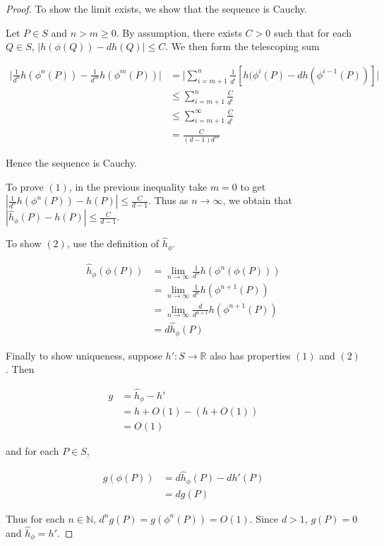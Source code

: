 \documentclass[12pt]{amsart}
\theoremstyle{definition}
\theoremstyle{remark}
\theoremstyle{definition}
\newcommand{\R}{\mathbb{R}}
\newcommand{\N}{\mathbb{N}}
\begin{document}
\begin{proof}
To show the limit exists, we show that the sequence is Cauchy. 

Let $P \in S$ and $n>m \geq 0$. By assumption, there exists $C > 0 $ such that for each $Q \in S$, $|h(\phi(Q)) - dh(Q)| \leq C$. We then form the telescoping sum 

\begin{align*}
\bigg|\frac{1}{d^n} h(\phi^n(P)) - \frac{1}{d^m} h(\phi^m(P))\bigg|&= \bigg|\sum_{i = m+1}^n \frac{1}{d^i}[h(\phi^i(P)-dh(\phi^{i-1}(P))]\bigg| \\
&\leq \sum_{i = m+1}^n \frac{C}{d^i} \\
&\leq \sum_{i = m+1}^{\infty} \frac{C}{d^i}\\
&= \frac{C}{(d-1)d^m}
\end{align*}

Hence the sequence is Cauchy.

To prove $(1)$, in the previous inequality take $m=0$ to get $|\frac{1}{d^n} h(\phi^n(P)) - h(P)| \leq \frac{C}{d-1}$. Thus as $n \rightarrow \infty$, we obtain that 
$|\hat{h}_\phi(P) - h(P)| \leq \frac{C}{d-1}$.

To show $(2)$, use the definition of $\hat{h}_\phi.$

\begin{align*}
\hat{h}_\phi(\phi(P)) 
&= \lim_{n \rightarrow \infty}\frac{1}{d^n}h(\phi^n(\phi(P)))\\
&= \lim_{n \rightarrow \infty}\frac{1}{d^n}h(\phi^{n+1}(P))\\
&= \lim_{n \rightarrow \infty}\frac{d}{d^{n+1}}h(\phi^{n+1}(P))\\
&= d\hat{h}_\phi(P)
\end{align*}

Finally to show uniqueness, suppose $h':S \rightarrow \R$ also has properties $(1)$ and $(2)$. Then 

\begin{align*}
g
&=\hat{h}_\phi-h' \\
&= h + O(1) -(h+O(1))\\
&= O(1)
\end{align*}

\noindent and for each $P \in S$,

\begin{align*}
g(\phi(P)) 
&= d\hat{h}_\phi(P) - dh'(P)\\
&=dg(P)
\end{align*}

Thus for each $n \in \N$, $d^ng(P) = g(\phi^n(P))= O(1)$.
Since $d > 1$, $g(P)=0$ and $\hat{h}_\phi = h'$.

\end{proof}
\end{document}
